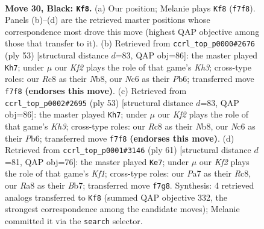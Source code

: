 \documentclass[11pt]{article}
\begin{document}
\clearpage

\begin{figure}[p]\centering
\begin{subfigure}{0.46\textwidth}\centering
\resizebox{\linewidth}{!}{%
\newchessgame
\chessboard[
  setfen={r1r5/pppb1k2/2n2p2/qP5Q/3Pp3/6P1/8/RNB2RK1 b - - 1 30},
  showmover=false,
  pgfstyle=straightmove, color=movearrow, markmove={f7-f8}
]}
\caption{}
\end{subfigure}\hfill
\begin{subfigure}{0.46\textwidth}\centering
\resizebox{\linewidth}{!}{%
\newchessgame
\chessboard[
  setfen={rn3Q2/p3p3/1p1p3k/4r2p/4q2P/2P5/PP2p1P1/R3R1K1 b - - 1 27},
  showmover=false,
  pgfstyle=straightmove, color=movearrow, markmove={h6-h7}
]}
\caption{}
\end{subfigure}
\\[4pt]
\begin{subfigure}{0.46\textwidth}\centering
\resizebox{\linewidth}{!}{%
\newchessgame
\chessboard[
  setfen={rn3Q2/p3p3/1p1p3k/4r2p/4q2P/2P5/PP2p1P1/R3R1K1 b - - 1 27},
  showmover=false,
  pgfstyle=straightmove, color=movearrow, markmove={h6-h7}
]}
\caption{}
\end{subfigure}\hfill
\begin{subfigure}{0.46\textwidth}\centering
\resizebox{\linewidth}{!}{%
\newchessgame
\chessboard[
  setfen={2r2k1Q/1b3pp1/1p6/3prq2/p2R4/P1P4R/2P4P/1KN5 b - - 1 31},
  showmover=false,
  pgfstyle=straightmove, color=movearrow, markmove={f8-e7}
]}
\caption{}
\end{subfigure}
\caption{\textbf{Move 30, Black: \texttt{Kf8}.} (a) Our position; Melanie plays \texttt{Kf8} (\texttt{f7f8}). Panels (b)--(d) are the retrieved master positions whose correspondence most drove this move (highest QAP objective among those that transfer to it). (b) Retrieved from \texttt{ccrl\_top\_p0000\#2676} (ply 53) [structural distance $d$=83, QAP obj=86]: the master played \texttt{Kh7}; under $\mu$ our \emph{Kf2} plays the role of that game's \emph{Kh3}; cross-type roles: our \emph{R}c8 as their \emph{N}b8, our \emph{N}c6 as their \emph{P}b6; transferred move \texttt{f7f8} \textbf{(endorses this move)}. (c) Retrieved from \texttt{ccrl\_top\_p0002\#2695} (ply 53) [structural distance $d$=83, QAP obj=86]: the master played \texttt{Kh7}; under $\mu$ our \emph{Kf2} plays the role of that game's \emph{Kh3}; cross-type roles: our \emph{R}c8 as their \emph{N}b8, our \emph{N}c6 as their \emph{P}b6; transferred move \texttt{f7f8} \textbf{(endorses this move)}. (d) Retrieved from \texttt{ccrl\_top\_p0001\#3146} (ply 61) [structural distance $d$=81, QAP obj=76]: the master played \texttt{Ke7}; under $\mu$ our \emph{Kf2} plays the role of that game's \emph{Kf1}; cross-type roles: our \emph{P}a7 as their \emph{R}c8, our \emph{R}a8 as their \emph{B}b7; transferred move \texttt{f7g8}. Synthesis: 4 retrieved analogs transferred to \texttt{Kf8} (summed QAP objective 332, the strongest correspondence among the candidate moves); Melanie committed it via the \texttt{search} selector.}
\label{fig:thought-m59}
\end{figure}
\end{document}
